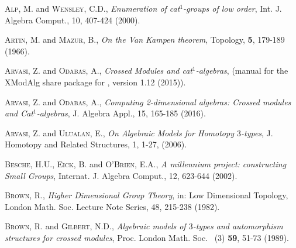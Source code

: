 \documentclass[a4paper,11pt]{article}
\theoremstyle{plain}
\theoremstyle{definition}
\begin{document}
\begin{thebibliography}{99}
	 \textsc{Alp, M.} and \textsc{Wensley, C.D.}, 
	\emph{Enumeration of cat$^{1}$-groups of low order}, 
	Int. J. Algebra Comput., 10, 407-424 (2000).
	
	 \textsc{Artin, M.} and \textsc{Mazur, B.}, 
	\emph{On the Van Kampen theorem},  
	Topology, \textbf{5}, 179-189 (1966).
	
	 \textsc{Arvasi, Z.} and \textsc{Odabas, A.},  
	\emph{Crossed Modules and cat$^1$-algebras}, 
	{(manual for the \textsf{XModAlg} share package for \GAP, version 1.12  
	(2015)).} 
	
	 \textsc{Arvasi, Z.} and \textsc{Odabas, A.}, 
	\emph{Computing 2-dimensional algebras: Crossed modules and Cat$^1$-algebras}, 
	J. Algebra Appl., 15, 165-185 (2016).
	
	 \textsc{Arvasi, Z.} and \textsc{Ulualan, E.}, 
	\emph{On Algebraic Models for Homotopy $3$-types}, 
	J. Homotopy and Related Structures, 1, 1-27, (2006).
		
	
	
	
	\textsc{Besche, H.U.}, \textsc{Eick, B.} and \textsc{O'Brien, E.A.}, 
	\emph{A millennium project: constructing Small Groups}, 
	Internat. J. Algebra Comput., 12, 623-644 (2002).
	
	 \textsc{Brown, R.}, 
	\emph{Higher Dimensional Group Theory}, 
	in: Low Dimensional Topology, 
	London Math. Soc. Lecture Note Series, 48, 215-238 (1982).
	
	
	 \textsc{Brown, R.} and \textsc{Gilbert, N.D.}, 
	\emph{Algebraic models of $3$-types and automorphism structures 
	for crossed modules}, 
	Proc. London Math. Soc. \ (3) \textbf{59}, 51-73 (1989).
	

\end{thebibliography}
\end{document}
